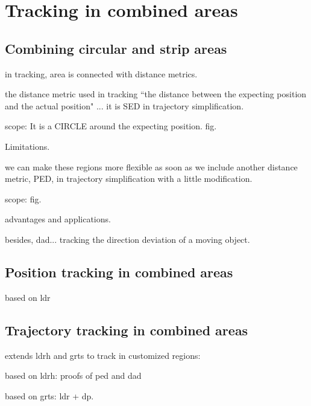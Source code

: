 

\section{Tracking in combined areas}
\label{sec:position}


\subsection{Combining circular and strip areas}
in tracking, area is connected with distance metrics.

the distance metric used in tracking ``the distance between the expecting position and the actual position" ... it is SED in trajectory simplification. 

scope: It is  a CIRCLE around the expecting position. fig.

Limitations.

we can make these regions more flexible as soon as we include another distance metric, PED, in trajectory simplification with a little modification.

scope: fig.

advantages and applications.

besides, dad... tracking the direction deviation of a moving object.
 
\subsection{Position tracking in combined areas}
based on ldr


\subsection{Trajectory tracking in combined areas}
extends ldrh and grts to track in customized regions:

based on ldrh: proofs of ped and dad

based on grts: ldr + dp. 
